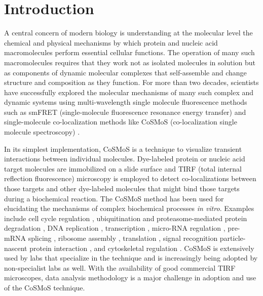 \section{Introduction}

A central concern of modern biology is understanding at the molecular level the chemical and physical mechanisms by which protein and nucleic acid macromolecules  perform essential cellular functions.  The operation of many such macromolecules requires that they work not as isolated molecules in solution but as components of dynamic molecular complexes that self-assemble and change structure and composition as they function.  For more than  two decades, scientists have successfully explored the molecular mechanisms of many such complex and dynamic systems using multi-wavelength single molecule fluorescence methods such as smFRET (single-molecule fluorescence resonance energy transfer) \citep{Roy2008-fo} and single-molecule co-localization methods like CoSMoS (co-localization single molecule spectroscopy) \citep{Larson2014-os, Van_Oijen2011-ig}.

In its simplest implementation, CoSMoS is a technique to visualize transient interactions between individual molecules.  Dye-labeled protein or nucleic acid target molecules are immobilized on a slide surface and TIRF (total internal reflection fluorescence) microscopy is employed to detect co-localizations between those targets and other dye-labeled molecules that might bind those targets during a biochemical reaction.  The CoSMoS method has been used for elucidating the mechanisms of complex biochemical processes \textit{in vitro}. Examples include cell cycle regulation \citep{Lu2015-eu}, ubiquitination and proteasome-mediated protein degradation \citep{Lu2015-jq}, DNA replication \citep{Geertsema2014-bt,Ticau2015-ib}, transcription \citep{Zhang2012-no,Friedman2012-if,Friedman2013-sf}, micro-RNA regulation \citep{Salomon2015-kq}, pre-mRNA splicing \citep{Shcherbakova2013-bi, Krishnan2013-fy, Warnasooriya2014-ls}, ribosome assembly \citep{Kim2014-zc}, translation \citep{Wang2015-tt,Tsai2014-mi,OLeary2013-wo}, signal recognition particle-nascent protein interaction \citep{Noriega2014-vj}, and cytoskeletal regulation \citep{Smith2013-qj,Breitsprecher2012-mj}. CoSMoS is extensively used by labs that specialize in the technique and is increasingly being adopted by non-specialist labs as well. With the availability of good commercial TIRF microscopes, data analysis methodology is a major challenge in adoption and use of the CoSMoS technique.

